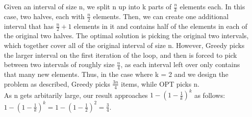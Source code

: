 \documentclass{article}
\begin{document}
\noindent Given an interval of size n, we split n up into k parts of $\frac{n}{k}$ elements each. In this case, two halves, each with $\frac{n}{2}$ elements. Then, we can create one additional interval that has $\frac{n}{2} + 1$ elements in it and contains half of the elements in each of the original two halves. The optimal solution is picking the original two intervals, which together cover all of the original interval of size n. However, Greedy picks the larger interval on the first iteration of the loop, and then is forced to pick between two intervals of roughly size $\frac{n}{4}$, as each interval left over only contains that many new elements. Thus, in the case where k = 2 and we design the problem as described, Greedy picks $\frac{3n}{4}$ items, while OPT picks n. \\

\noindent As n gets arbitarily large, our result approaches $1 - (1 - \frac{1}{k})^{k}$ as follows:\\
 $1 - (1 - \frac{1}{k})^{k} =  1 - (1 - \frac{1}{2})^{2} =  \frac{3}{4}$.

\vspace{3in}
\end{document}
